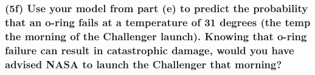 \documentclass[
]{article}
\begin{document}
\hypertarget{f-use-your-model-from-part-e-to-predict-the-probability-that-an-o-ring-fails-at-a-temperature-of-31-degrees-the-temp-the-morning-of-the-challenger-launch.-knowing-that-o-ring-failure-can-result-in-catastrophic-damage-would-you-have-advised-nasa-to-launch-the-challenger-that-morning}{%
\subsubsection{(5f) Use your model from part (e) to predict the
probability that an o-ring fails at a temperature of 31 degrees (the
temp the morning of the Challenger launch). Knowing that o-ring failure
can result in catastrophic damage, would you have advised NASA to launch
the Challenger that
morning?}\label{f-use-your-model-from-part-e-to-predict-the-probability-that-an-o-ring-fails-at-a-temperature-of-31-degrees-the-temp-the-morning-of-the-challenger-launch.-knowing-that-o-ring-failure-can-result-in-catastrophic-damage-would-you-have-advised-nasa-to-launch-the-challenger-that-morning}}
\end{document}
